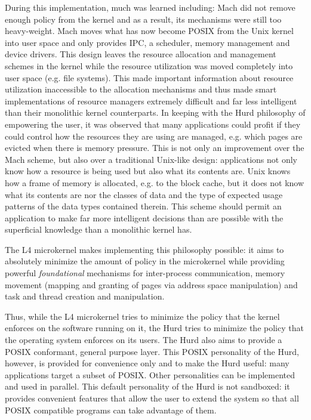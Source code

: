 During this implementation, much was learned including: Mach did not
remove enough policy from the kernel and as a result, its mechanisms
were still too heavy-weight.  Mach moves what has now become POSIX
from the Unix kernel into user space and only provides IPC, a
scheduler, memory management and device drivers.  This design leaves
the resource allocation and management schemes in the kernel while the
resource utilization was moved completely into user space (e.g. file
systems).  This made important information about resource utilization
inaccessible to the allocation mechanisms and thus made smart
implementations of resource managers extremely difficult and far less
intelligent than their monolithic kernel counterparts.  In keeping
with the Hurd philosophy of empowering the user, it was observed that
many applications could profit if they could control how the resources
they are using are managed, e.g. which pages are evicted when there is
memory pressure.  This is not only an improvement over the Mach
scheme, but also over a traditional Unix-like design: applications not
only know how a resource is being used but also what its contents are.
Unix knows how a frame of memory is allocated, e.g. to the block
cache, but it does not know what its contents are nor the classes of
data and the type of expected usage patterns of the data types
contained therein.  This scheme should permit an application to make
far more intelligent decisions than are possible with the superficial
knowledge than a monolithic kernel has.

The L4 microkernel makes implementing this philosophy possible: it
aims to absolutely minimize the amount of policy in the microkernel
while providing powerful \emph{foundational} mechanisms for
inter-process communication, memory movement (mapping and granting of
pages via address space manipulation) and task and thread creation and
manipulation.

Thus, while the L4 microkernel tries to minimize the policy that the
kernel enforces on the software running on it, the Hurd tries to
minimize the policy that the operating system enforces on its users.
The Hurd also aims to provide a POSIX conformant, general purpose
layer.  This POSIX personality of the Hurd, however, is provided for
convenience only and to make the Hurd useful: many applications target
a subset of POSIX.  Other personalities can be implemented and used in
parallel.  This default personality of the Hurd is not sandboxed: it
provides convenient features that allow the user to extend the system
so that all POSIX compatible programs can take advantage of them.

